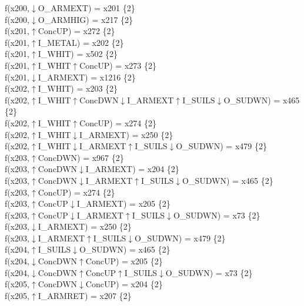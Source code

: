 f(x200,$\downarrow$O\_ARMEXT) = x201 \{2\} \\  
f(x200,$\downarrow$O\_ARMHIG) = x217 \{2\} \\  
f(x201,$\uparrow$ConcUP) = x272 \{2\} \\  
f(x201,$\uparrow$I\_METAL) = x202 \{2\} \\  
f(x201,$\uparrow$I\_WHIT) = x502 \{2\} \\  
f(x201,$\uparrow$I\_WHIT$\uparrow$ConcUP) = x273 \{2\} \\  
f(x201,$\downarrow$I\_ARMEXT) = x1216 \{2\} \\  
f(x202,$\uparrow$I\_WHIT) = x203 \{2\} \\  
f(x202,$\uparrow$I\_WHIT$\uparrow$ConcDWN$\downarrow$I\_ARMEXT$\uparrow$I\_SUILS$\downarrow$O\_SUDWN) = x465 \{2\} \\  
f(x202,$\uparrow$I\_WHIT$\uparrow$ConcUP) = x274 \{2\} \\  
f(x202,$\uparrow$I\_WHIT$\downarrow$I\_ARMEXT) = x250 \{2\} \\  
f(x202,$\uparrow$I\_WHIT$\downarrow$I\_ARMEXT$\uparrow$I\_SUILS$\downarrow$O\_SUDWN) = x479 \{2\} \\  
f(x203,$\uparrow$ConcDWN) = x967 \{2\} \\  
f(x203,$\uparrow$ConcDWN$\downarrow$I\_ARMEXT) = x204 \{2\} \\  
f(x203,$\uparrow$ConcDWN$\downarrow$I\_ARMEXT$\uparrow$I\_SUILS$\downarrow$O\_SUDWN) = x465 \{2\} \\  
f(x203,$\uparrow$ConcUP) = x274 \{2\} \\  
f(x203,$\uparrow$ConcUP$\downarrow$I\_ARMEXT) = x205 \{2\} \\  
f(x203,$\uparrow$ConcUP$\downarrow$I\_ARMEXT$\uparrow$I\_SUILS$\downarrow$O\_SUDWN) = x73 \{2\} \\  
f(x203,$\downarrow$I\_ARMEXT) = x250 \{2\} \\  
f(x203,$\downarrow$I\_ARMEXT$\uparrow$I\_SUILS$\downarrow$O\_SUDWN) = x479 \{2\} \\  
f(x204,$\uparrow$I\_SUILS$\downarrow$O\_SUDWN) = x465 \{2\} \\  
f(x204,$\downarrow$ConcDWN$\uparrow$ConcUP) = x205 \{2\} \\  
f(x204,$\downarrow$ConcDWN$\uparrow$ConcUP$\uparrow$I\_SUILS$\downarrow$O\_SUDWN) = x73 \{2\} \\  
f(x205,$\uparrow$ConcDWN$\downarrow$ConcUP) = x204 \{2\} \\  
f(x205,$\uparrow$I\_ARMRET) = x207 \{2\} \\  
